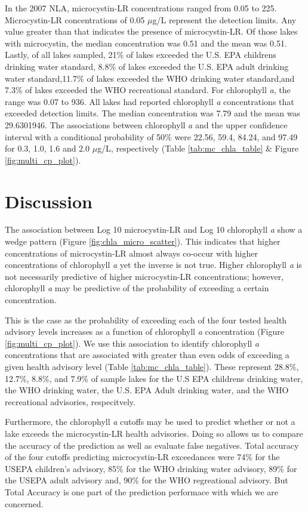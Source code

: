\documentclass[11pt,]{article}
\begin{document}
In the 2007 NLA, microcystin-LR concentrations ranged from 0.05 to 225.
Microcystin-LR concentrations of 0.05 \(\mu\)g/L represent the detection
limits. Any value greater than that indicates the presence of
microcystin-LR. Of those lakes with microcystin, the median
concentration was 0.51 and the mean was 0.51. Lastly, of all lakes
sampled, 21\% of lakes exceeded the U.S. EPA childrens drinking water
standard, 8.8\% of lakes exceeded the U.S. EPA adult drinking water
standard,11.7\% of lakes exceeded the WHO drinking water standard,and
7.3\% of lakes exceeded the WHO recreational standard. For chlorophyll
\emph{a}, the range was 0.07 to 936. All lakes had reported chlorophyll
\emph{a} concentrations that exceeded detection limits. The median
concentration was 7.79 and the mean was 29.6301946. The associations
between chlorophyll \emph{a} and the upper confidence interval with a
conditional probability of 50\% were 22.56, 59.4, 84.24, and 97.49 for
0.3, 1.0, 1.6 and 2.0 \(\mu\)g/L, respectively (Table
\ref{tab:mc_chla_table} \& Figure \ref{fig:multi_cp_plot}).

\section{Discussion}\label{discussion}

The association between Log 10 microcystin-LR and Log 10 chlorophyll
\emph{a} show a wedge pattern (Figure \ref{fig:chla_micro_scatter}).
This indicates that higher concentrations of microcystin-LR almost
always co-occur with higher concentrations of chlorophyll \emph{a} yet
the inverse is not true. Higher chlorophyll \emph{a} is not necessarily
predictive of higher microcystin-LR concentrations; however, chlorophyll
\emph{a} may be predictive of the probability of exceeding a certain
concentration.

This is the case as the probability of exceeding each of the four tested
health advisory levels increases as a function of chlorophyll \emph{a}
concentration (Figure \ref{fig:multi_cp_plot}). We use this association
to identify chlorophyll \emph{a} concentrations that are associated with
greater than even odds of exceeding a given health advisory level (Table
\ref{tab:mc_chla_table}). These represent 28.8\%, 12.7\%, 8.8\%, and
7.9\% of sample lakes for the U.S EPA childrens drinking water, the WHO
drinking water, the U.S. EPA Adult drinking water, and the WHO
recreational advisories, respecitvely.

Furthermore, the chlorophyll \emph{a} cutoffs may be used to predict
whether or not a lake exceeds the microcystin-LR health advisories.
Doing so allows us to compare the accuracy of the prediction as well as
evaluate false negatives. Total accuracy of the four cutoffs predicting
microcystin-LR exceedances were 74\% for the USEPA children's advisory,
85\% for the WHO drinking water advisory, 89\% for the USEPA adult
advisory and, 90\% for the WHO regreational advisory. But Total Accuracy
is one part of the prediction performace with which we are concerned.
\end{document}
